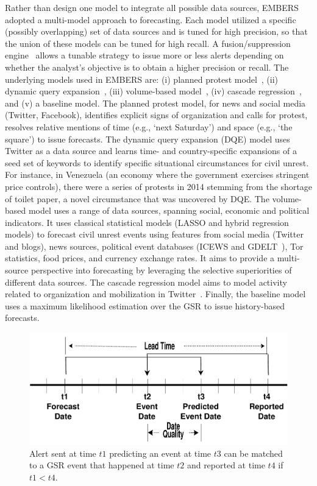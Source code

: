 Rather than design one model to integrate all possible data sources, EMBERS adopted a multi-model
approach to forecasting. Each model utilized a specific (possibly overlapping) set of data sources
and is tuned for high precision, so that the union of these models can be tuned for high recall.
A fusion/suppression engine~\cite{andy-scotland-paper} allows a tunable
strategy to issue more or less
alerts depending on whether the analyst's objective is to obtain a higher
precision or recall. The underlying models used in EMBERS are: (i) planned protest model~\cite{pp-paper1},
(ii) dynamic query expansion~\cite{dqe-plosone}, (iii) volume-based model~\cite{asonam},
(iv) cascade regression~\cite{anil-plosone}, and (v) a baseline model. The planned protest model,
for news and social media (Twitter, Facebook), identifies explicit signs of organization and calls
for protest, resolves relative mentions of time (e.g., `next Saturday') and space (e.g., `the square')
to issue forecasts. The dynamic query expansion (DQE) model uses Twitter as a data source and learns time- and country-specific
expansions of a seed set of keywords to identify specific situational circumstances for civil unrest.
For instance, in Venezuela (an economy where the government exercises stringent price controls),
there were a series of protests in 2014 stemming from the shortage of toilet paper, a novel circumstance
that was uncovered by DQE. The volume-based model uses a range of data sources, spanning
social, economic
and political indicators. It uses classical statistical models (LASSO
and hybrid regression models) to forecast civil unrest events using features
from social media (Twitter and blogs), news sources,
political event databases (ICEWS and GDELT~\cite{gdelt}), Tor~\cite{tor} statistics, food prices, and currency
exchange rates. It aims to provide a multi-source perspective into forecasting by leveraging
the selective superiorities of different data sources.  The cascade regression model
aims to model activity related to organization and mobilization in Twitter~\cite{anil-plosone}.
Finally, the baseline model uses a maximum likelihood
estimation over the GSR to issue history-based forecasts.

\begin{figure}
\includegraphics[width=\columnwidth]{figures/cu/timeline.pdf}
\caption{Alert sent at time $t1$ predicting an event at time $t3$
can be matched to a GSR event that happened at time $t2$ and reported
at time $t4$ if $t1 < t4$.}
\label{fig:leadtime}
\end{figure}


